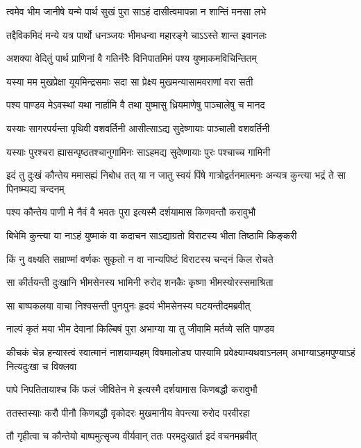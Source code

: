 \twolineshloka
{त्वमेव भीम जानीषे यन्मे पार्थ सुखं पुरा}
{साऽहं दासीत्वमापन्ना न शान्तिं मनसा लभे}


\twolineshloka
{तद्दैविकमिदं मन्ये यत्र पार्थो धनञ्जयः}
{भीमधन्वा महारङ्गे चाऽऽस्ते शान्त इवानलः}


\twolineshloka
{अशक्या वेदितुं पार्थ प्राणिनां वै गतिर्नरैः}
{विनिपातमिमं पश्य युष्माकमविचिन्तितम्}


\twolineshloka
{यस्या मम मुखप्रेक्षा यूयमिन्द्रसमाः सदा}
{सा प्रेक्ष्य मुखमन्यासामवराणां वरा सती}


\twolineshloka
{पश्य पाण्डव मेऽवस्थां यथा नार्हामि वै तथा}
{युष्मासु ध्रियमाणेषु पाञ्चालेषु च मानद}


\twolineshloka
{यस्याः सागरपर्यन्ता पृथिवी वशवर्तिनी}
{आसीत्साऽद्य सुदेष्णायाः पाञ्चाली वशवर्तिनी}


\twolineshloka
{यस्याः पुरश्चरा ह्यासन्पृष्ठतश्चानुगामिनः}
{साऽहमद्य सुदेष्णायाः पुरः पश्चाच्च गामिनी}


\threelineshloka
{इदं तु दुःखं कौन्तेय ममासह्यं निबोध तत्}
{या न जातु स्वयं पिंषे गात्रोद्वर्तनमात्मनः}
{अन्यत्र कुन्त्या भद्रं ते सा पिनष्म्यद्य चन्दनम्}


\twolineshloka
{पश्य कौन्तेय पाणी मे नैवं वै भवतः पुरा}
{इत्यस्मै दर्शयामास किणवन्तौ करावुभौ}


\twolineshloka
{बिभेमि कुन्त्या या नाऽहं युष्माकं वा कदाचन}
{साऽद्याग्रतो विराटस्य भीता तिष्ठामि किङ्करी}


\twolineshloka
{किं नु वक्ष्यति सम्राण्मां वर्णकः सुकृतो न वा}
{नान्यपिष्टं विराटस्य चन्दनं किल रोचते}



\twolineshloka
{सा कीर्तयन्ती दुःखानि भीमसेनस्य भामिनी}
{रुरोद शनकैः कृष्णा भीमस्योरस्समाश्रिता}


\twolineshloka
{सा बाष्पकलया वाचा निश्वसन्ती पुनःपुनः}
{हृदयं भीमसेनस्य घटयन्तीदमब्रवीत्}


\twolineshloka
{नाल्पं कृतं मया भीम देवानां किल्बिषं पुरा}
{अभाग्या या तु जीवामि मर्तव्ये सति पाण्डव}


\threelineshloka
{कीचकं चेन्न हन्यास्त्वं स्वात्मानं नाशयाम्यहम्}
{विषमालोड्य पास्यामि प्रवेक्ष्याम्यथवाऽनलम्}
{अभाग्याऽहमपुण्याऽहं नित्यदुःखा च विक्लवा}


\twolineshloka
{पापे निपतितायाश्च किं फलं जीवितेन मे}
{इत्यस्मै दर्शयामास किणबद्धौ करावुभौ}


\twolineshloka
{ततस्तस्याः करौ पीनौ किणबद्धौ वृकोदरः}
{मुखमानीय वेपन्त्या रुरोद परवीरहा}


\twolineshloka
{तौ गृहीत्वा च कौन्तेयो बाष्पमुत्सृज्य वीर्यवान्}
{ततः परमदुःखार्त इदं वचनमब्रवीत्}

